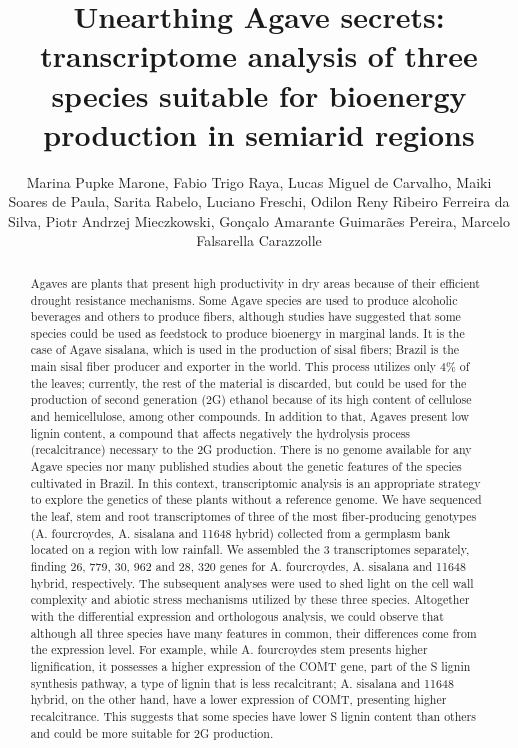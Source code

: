 \documentclass[twoside]{article}
\title{\vspace{-15mm}\fontsize{24pt}{10pt}\selectfont\textbf{ Unearthing Agave secrets: transcriptome analysis of three species suitable for bioenergy production in semiarid regions }} %
\author{ Marina Pupke Marone, Fabio Trigo Raya, Lucas Miguel de Carvalho, Maiki Soares de Paula, Sarita Rabelo, Luciano Freschi, Odilon Reny Ribeiro Ferreira da Silva, Piotr Andrzej Mieczkowski, Gon\c{c}alo Amarante Guimar\~aes Pereira, Marcelo Falsarella Carazzolle }
\affil{ USP }
\date{}
\begin{document}
  
  
  \maketitle %
  
  
  \thispagestyle{fancy} %
  
  
  \begin{abstract}
  Agaves are plants that present high productivity in dry areas because of their efficient drought resistance mechanisms. Some Agave species are used to produce alcoholic beverages and others to produce fibers,  although studies have suggested that some species could be used as feedstock to produce bioenergy in marginal lands. It is the case of Agave sisalana,  which is used in the production of sisal fibers; Brazil is the main sisal fiber producer and exporter in the world. This process utilizes only 4\% of the leaves; currently,  the rest of the material is discarded,  but could be used for the production of second generation (2G) ethanol because of its high content of cellulose and hemicellulose,  among other compounds. In addition to that,  Agaves present low lignin content,  a compound that affects negatively the hydrolysis process (recalcitrance) necessary to the 2G production.
There is no genome available for any Agave species nor many published studies about the genetic features of the species cultivated in Brazil. In this context,  transcriptomic analysis is an appropriate strategy to explore the genetics of these plants without a reference genome. We have sequenced the leaf,  stem and root transcriptomes of three of the most fiber-producing genotypes (A. fourcroydes,  A. sisalana and 11648 hybrid) collected from a germplasm bank located on a region with low rainfall. We assembled the 3 transcriptomes separately,  finding 26, 779,  30, 962 and 28, 320 genes for A. fourcroydes,  A. sisalana and 11648 hybrid,  respectively.
The subsequent analyses were used to shed light on the cell wall complexity and abiotic stress mechanisms utilized by these three species. Altogether with the differential expression and orthologous analysis,  we could observe that although all three species have many features in common,  their differences come from the expression level. For example,  while A. fourcroydes stem presents higher lignification,  it possesses a higher expression of the COMT gene,  part of the S lignin synthesis pathway,  a type of lignin that is less recalcitrant; A. sisalana and 11648 hybrid,  on the other hand,  have a lower expression of COMT,  presenting higher recalcitrance. This suggests that some species have lower S lignin content than others and could be more suitable for 2G production.

\end{abstract}
\end{document}
